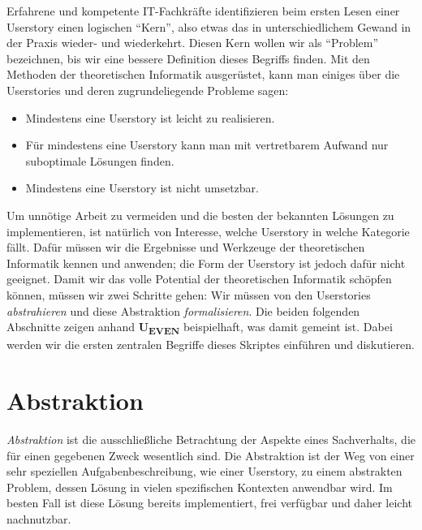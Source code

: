 Erfahrene und kompetente IT-Fachkräfte identifizieren beim ersten Lesen einer Userstory
einen logischen ``Kern'',
also etwas das in unterschiedlichem Gewand in der Praxis wieder- und wiederkehrt.
Diesen Kern wollen wir als ``Problem'' bezeichnen,
bis wir eine bessere Definition dieses Begriffs finden.
Mit den Methoden der theoretischen Informatik ausgerüstet,
kann man einiges über die Userstories und deren zugrundeliegende Probleme sagen:
\begin{itemize}
    \item Mindestens eine Userstory ist leicht zu realisieren.
    \item Für mindestens eine Userstory kann man mit vertretbarem Aufwand nur suboptimale Lösungen finden.
    \item Mindestens eine Userstory ist nicht umsetzbar.
\end{itemize}
Um unnötige Arbeit zu vermeiden
und die besten der bekannten Lösungen zu implementieren,
ist natürlich von Interesse,
welche Userstory in welche Kategorie fällt.
Dafür müssen wir die Ergebnisse und Werkzeuge
der theoretischen Informatik kennen und anwenden;
die Form der Userstory ist jedoch dafür nicht geeignet.
Damit wir das volle Potential der theoretischen Informatik schöpfen können,
müssen wir zwei Schritte gehen:
Wir müssen von den Userstories \emph{abstrahieren}
und diese Abstraktion \emph{formalisieren}.
Die beiden folgenden Abschnitte zeigen anhand \textbf{U\textsubscript{EVEN}}
beispielhaft, was damit gemeint ist.
Dabei werden wir die ersten zentralen Begriffe dieses Skriptes einführen und diskutieren.
\section{Abstraktion}

\emph{Abstraktion} ist die ausschließliche Betrachtung der Aspekte eines Sachverhalts,
die für einen gegebenen Zweck wesentlich sind.
Die Abstraktion ist der Weg von einer sehr speziellen Aufgabenbeschreibung,
wie einer Userstory, zu einem abstrakten Problem,
dessen Lösung in vielen spezifischen Kontexten anwendbar wird.
Im besten Fall ist diese Lösung bereits implementiert, frei verfügbar 
und daher leicht nachnutzbar.

